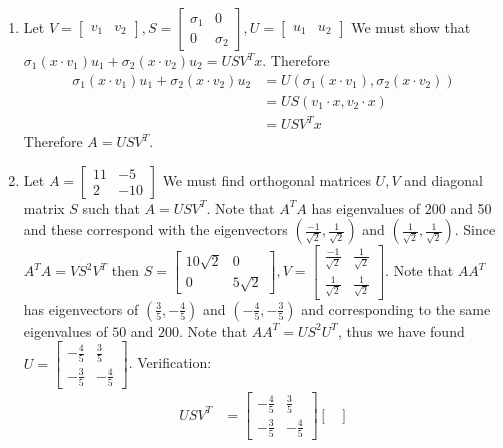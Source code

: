 \documentclass[12pt, letterpaper]{article}
\begin{document}
\begin{enumerate}
	\item Let $V = \begin{bmatrix}
	v_1 & v_2
\end{bmatrix}	, S = \begin{bmatrix}
\sigma_1 & 0\\ 0& \sigma_2
\end{bmatrix}, U = \begin{bmatrix}
u_1 & u_2
\end{bmatrix} $  We must show that $\sigma_1 (x\cdot v_1)u_1 + \sigma_2 (x\cdot v_2)u_2 = USV^T x$.  Therefore
\begin{align*}
	\sigma_1 (x\cdot v_1)u_1 + \sigma_2 (x\cdot v_2)u_2 &= U(\sigma_1 (x\cdot v_1), \sigma_2 (x\cdot v_2))\\
	&= US(v_1 \cdot x, v_2 \cdot x)\\
	&= USV^T x
\end{align*}
	Therefore $A = USV^T$.
	\item Let $A = \begin{bmatrix}
	11 & -5\\2 & -10
\end{bmatrix}$  We must find orthogonal matrices $U,V$ and diagonal matrix $S$ such that $A = USV^T$.  Note that $A^T A$ has eigenvalues of  $200$ and 50 and these correspond with the eigenvectors $(\frac{-1}{\sqrt{2}},\frac{1}{\sqrt{2}})$ and $(\frac{1}{\sqrt{2}},\frac{1}{\sqrt{2}})$.  Since $A^T A = V S^2 V^T$ then $S = \begin{bmatrix}
10\sqrt{2} & 0 \\ 0 & 5\sqrt{2}
\end{bmatrix}, V = \begin{bmatrix}
\frac{-1}{\sqrt{2}} & \frac{1}{\sqrt{2}}\\
\frac{1}{\sqrt{2}} & \frac{1}{\sqrt{2}}
\end{bmatrix}$. Note that $A A^T$ has eigenvectors of           $(\frac{3}{5}, -\frac{4}{5})$ and $(-\frac{4}{5},-\frac{3}{5})$ and corresponding to the same eigenvalues of $50$ and $200$.  Note that $A A^T = U S^2 U^T$, thus we have found $U = \begin{bmatrix}
-\frac{4}{5} & \frac{3}{5}\\
-\frac{3}{5} & -\frac{4}{5}
\end{bmatrix} $.  
	Verification:
		\begin{align*}
			USV^T &=  \begin{bmatrix}
-\frac{4}{5} & \frac{3}{5}\\
-\frac{3}{5} & -\frac{4}{5}
\end{bmatrix} \begin{bmatrix}

\end{bmatrix}
\end{align*}
\end{enumerate}
\end{document}

